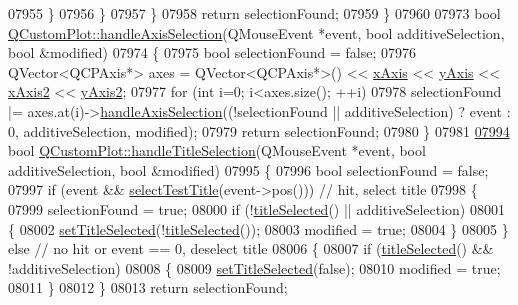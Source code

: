 \begin{DoxyCode}
07955       \}
07956     \}
07957   \}
07958   \textcolor{keywordflow}{return} selectionFound;
07959 \}
07960 
07973 \textcolor{keywordtype}{bool} \hyperlink{a00116_a6085478fe8ba07b2a192cf8217133cb3}{QCustomPlot::handleAxisSelection}(QMouseEvent *event, \textcolor{keywordtype}{bool} 
      additiveSelection, \textcolor{keywordtype}{bool} &modified)
07974 \{
07975   \textcolor{keywordtype}{bool} selectionFound = \textcolor{keyword}{false};
07976   QVector<QCPAxis*> axes = QVector<QCPAxis*>() << \hyperlink{a00116_a384438707adbcc96b0fa1324106f7129}{xAxis} << \hyperlink{a00116_af168096ce67002b1fbce18ae5dd1b652}{yAxis} << 
      \hyperlink{a00116_a058f6d3a4c86bf94c476e5c380711dba}{xAxis2} << \hyperlink{a00116_a4fd6679232da7da0a1ae4e1b6ae83d6e}{yAxis2};
07977   \textcolor{keywordflow}{for} (\textcolor{keywordtype}{int} i=0; i<axes.size(); ++i)
07978     selectionFound |= axes.at(i)->\hyperlink{a00025_ac68d1c81004fded1f3c4ca95879a445d}{handleAxisSelection}((!selectionFound || 
      additiveSelection) ? event : 0, additiveSelection, modified);
07979   \textcolor{keywordflow}{return} selectionFound;
07980 \}
07981 
\hypertarget{a00115_source_l07994}{}\hyperlink{a00116_ae688ab743e775cd0c69941a082dd32e3}{07994} \textcolor{keywordtype}{bool} \hyperlink{a00116_ae688ab743e775cd0c69941a082dd32e3}{QCustomPlot::handleTitleSelection}(QMouseEvent *event, \textcolor{keywordtype}{bool} 
      additiveSelection, \textcolor{keywordtype}{bool} &modified)
07995 \{
07996   \textcolor{keywordtype}{bool} selectionFound = \textcolor{keyword}{false};
07997   \textcolor{keywordflow}{if} (event && \hyperlink{a00116_a2a2d01a092840ac01b16104f7973f831}{selectTestTitle}(event->pos())) \textcolor{comment}{// hit, select title}
07998   \{
07999     selectionFound = \textcolor{keyword}{true};
08000     \textcolor{keywordflow}{if} (!\hyperlink{a00116_a23f3f4b312d1d78837f2a3602792d8e3}{titleSelected}() || additiveSelection)
08001     \{
08002       \hyperlink{a00116_aa89e06c04804ff2a0994ccb1aa80d131}{setTitleSelected}(!\hyperlink{a00116_a23f3f4b312d1d78837f2a3602792d8e3}{titleSelected}());
08003       modified = \textcolor{keyword}{true};
08004     \}
08005   \} \textcolor{keywordflow}{else} \textcolor{comment}{// no hit or event == 0, deselect title}
08006   \{
08007     \textcolor{keywordflow}{if} (\hyperlink{a00116_a23f3f4b312d1d78837f2a3602792d8e3}{titleSelected}() && !additiveSelection)
08008     \{
08009       \hyperlink{a00116_aa89e06c04804ff2a0994ccb1aa80d131}{setTitleSelected}(\textcolor{keyword}{false});
08010       modified = \textcolor{keyword}{true};
08011     \}
08012   \}
08013   \textcolor{keywordflow}{return} selectionFound;

\end{DoxyCode}
